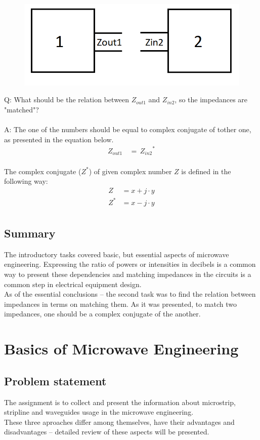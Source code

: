 \documentclass[eng,printmode]{mgr}
\begin{document}
\begin{figure}[h]
	\centering
	\includegraphics[width=0.3\linewidth]{matching}
	\label{fig:matching}
\end{figure}
\noindent
Q: What should be the relation between $Z_{out1}$ and $Z_{in2}$, so the impedances are "matched"?
\\
\\
A: The one of the numbers should be equal to complex conjugate of tother one, as presented in the equation below.
\begin{align*}
Z_{out1}\, &= \, {Z_{in2}}^*
\end{align*}
\\
The complex conjugate ($Z^*$) of given complex number $Z$ is defined in the following way:
\begin{align*}
Z &= x + j\cdot y \\
Z^* &= x - j\cdot y \\
\end{align*}
\section{Summary}
The introductory tasks covered basic, but essential aspects of microwave engineering. Expressing the ratio of powers or intensities in decibels is a common way to present these dependencies and matching impedances in the circuits is a common step in electrical equipment design.\\
As of the essential conclusions -- the second task was to find the relation between impedances in terms on matching them. As it was presented, to match two impedances, one should be a complex conjugate of the another.

\chapter{Basics of Microwave Engineering}
\section{Problem statement}
The assignment is to collect and present the information about microstrip, stripline and waveguides usage in the microwave engineering.\\
These three aproaches differ among themselves, have their advantages and disadvantages -- detailed review of these aspects will be presented.
\end{document}
